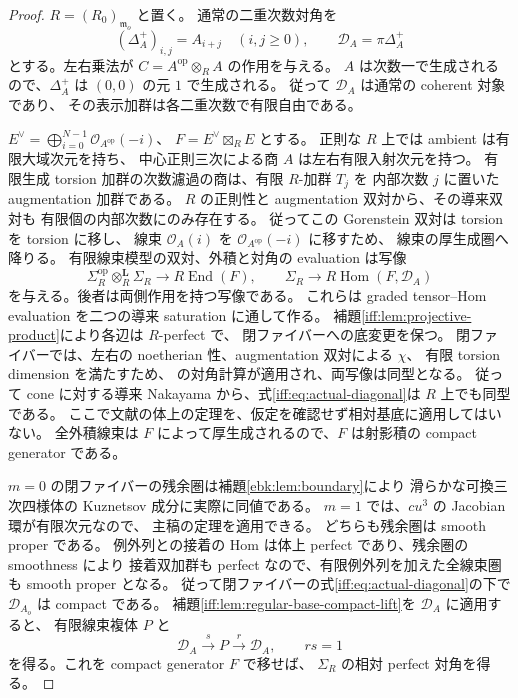 \begin{proof}
$R=(R_0)_{\mathfrak m_o}$ と置く。
通常の二重次数対角を
\[
 (\Delta_A^+)_{i,j}=A_{i+j}\quad(i,j\geq0),\qquad
 \mathcal D_A=\pi\Delta_A^+
\]
とする。左右乗法が $C=A^{\mathrm{op}}\otimes_R A$ の作用を与える。
$A$ は次数一で生成されるので、$\Delta_A^+$ は $(0,0)$ の元 $1$ で生成される。
従って $\mathcal D_A$ は通常の coherent 対象であり、
その表示加群は各二重次数で有限自由である。

$E^\vee=\bigoplus_{i=0}^{N-1}\mathcal O_{A^{\mathrm{op}}}(-i)$、
$F=E^\vee\boxtimes_RE$ とする。
正則な $R$ 上では ambient は有限大域次元を持ち、
中心正則三次による商 $A$ は左右有限入射次元を持つ。
有限生成 torsion 加群の次数濾過の商は、有限 $R$-加群 $T_j$ を
内部次数 $j$ に置いた augmentation 加群である。
$R$ の正則性と augmentation 双対から、その導来双対も
有限個の内部次数にのみ存在する。
従ってこの Gorenstein 双対は torsion を torsion に移し、
線束 $\mathcal O_A(i)$ を $\mathcal O_{A^{\mathrm{op}}}(-i)$ に移すため、
線束の厚生成圏へ降りる。
有限線束模型の双対、外積と対角の evaluation は写像
\begin{equation}\label{iff:eq:actual-diagonal}
 \Sigma_R^{\mathrm{op}}\otimes_R^{\mathbf L}\Sigma_R
       \longrightarrow R\operatorname{End}(F),\qquad
 \Sigma_R\longrightarrow R\operatorname{Hom}(F,\mathcal D_A)
\end{equation}
を与える。後者は両側作用を持つ写像である。
これらは graded tensor--Hom evaluation を二つの導来 saturation に通して作る。
補題\ref{iff:lem:projective-product}により各辺は $R$-perfect で、
閉ファイバーへの底変更を保つ。
閉ファイバーでは、左右の noetherian 性、augmentation 双対による $\chi$、
有限 torsion dimension を満たすため、
\cite[Proposition~3.42, Lemma~4.9, Corollary~4.12,
Proposition~4.14, Theorem~4.15, Remark~4.17]{CMOBallardFarman}
の対角計算が適用され、両写像は同型となる。
従って cone に対する導来 Nakayama から、式\eqref{iff:eq:actual-diagonal}は
$R$ 上でも同型である。
ここで文献の体上の定理を、仮定を確認せず相対基底に適用してはいない。
全外積線束は $F$ によって厚生成されるので、$F$ は射影積の compact generator である。

$m=0$ の閉ファイバーの残余圏は補題\ref{ebk:lem:boundary}により
滑らかな可換三次四様体の Kuznetsov 成分に実際に同値である。
$m=1$ では、$cu^3$ の Jacobian 環が有限次元なので、
主稿の定理を適用できる。
どちらも残余圏は smooth proper である。
例外列との接着の Hom は体上 perfect であり、残余圏の smoothness により
接着双加群も perfect なので、有限例外列を加えた全線束圏も smooth proper となる。
従って閉ファイバーの式\eqref{iff:eq:actual-diagonal}の下で
$\mathcal D_{A_o}$ は compact である。
補題\ref{iff:lem:regular-base-compact-lift}を $\mathcal D_A$ に適用すると、
有限線束複体 $P$ と
\[
 \mathcal D_A\xrightarrow{s}P\xrightarrow{r}\mathcal D_A,
                  \qquad rs=1
\]
を得る。これを compact generator $F$ で移せば、
$\Sigma_R$ の相対 perfect 対角を得る。


\end{proof}
